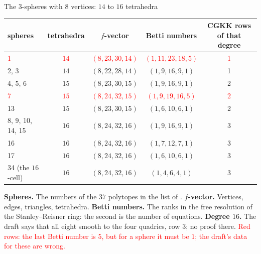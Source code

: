 \begin{frame}{The \(3\)-spheres with \(8\) vertices: \(14\) to \(16\) tetrahedra}
{\centering\small
\renewcommand{\arraystretch}{1.0}\setlength{\tabcolsep}{5pt}
\begin{tabular}{lcccc}
spheres & tetrahedra & \(f\)-vector & Betti numbers & CGKK rows of that degree\\ \hline
\textcolor{red}{1} & \textcolor{red}{\(14\)} & \textcolor{red}{\((8,23,30,14)\)} & \textcolor{red}{\((1,11,23,18,5)\)} & \textcolor{red}{1}\\
2, 3 & \(14\) & \((8,22,28,14)\) & \((1,9,16,9,1)\) & 1\\
4, 5, 6 & \(15\) & \((8,23,30,15)\) & \((1,9,16,9,1)\) & 2\\
\textcolor{red}{7} & \textcolor{red}{\(15\)} & \textcolor{red}{\((8,24,32,15)\)} & \textcolor{red}{\((1,9,19,16,5)\)} & \textcolor{red}{2}\\
13 & \(15\) & \((8,23,30,15)\) & \((1,6,10,6,1)\) & 2\\
8, 9, 10, 14, 15 & \(16\) & \((8,24,32,16)\) & \((1,9,16,9,1)\) & 3\\
16 & \(16\) & \((8,24,32,16)\) & \((1,7,12,7,1)\) & 3\\
17 & \(16\) & \((8,24,32,16)\) & \((1,6,10,6,1)\) & 3\\
34 (the \(16\)-cell) & \(16\) & \((8,24,32,16)\) & \((1,4,6,4,1)\) & 3\\
\end{tabular}\par}\smallskip
{\footnotesize \textbf{Spheres.} The numbers of the \(37\) polytopes in the list of \cite{GS}. \textbf{\(f\)-vector.} Vertices, edges, triangles, tetrahedra. \textbf{Betti numbers.} The ranks in the free resolution of the Stanley--Reisner ring: the second is the number of equations. \textbf{Degree \(16\).} The draft says that all eight smooth to the four quadrics, row 3; no proof there. \textcolor{red}{Red rows: the last Betti number is \(5\), but for a sphere it must be \(1\); the draft's data for these are wrong.}\par}
\end{frame}

